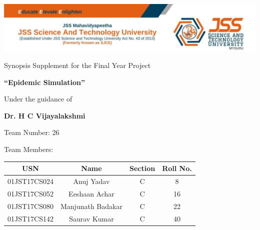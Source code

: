 \documentclass[14pt, a4paper]{extarticle}
\begin{document}
    \begin{titlepage}
		\thispagestyle{empty}
		\thisfancypage{\setlength{\fboxsep}{1pt}\doublebox}{}
		
		\begin{center}
    		\includegraphics[scale=0.26]{images/jss_header.png}
    		
    		\vspace{0.5in}
			Synopsis Supplement for the Final Year Project
		
			\vspace{0.125in}
			{\Large \textbf{``Epidemic Simulation''}}
			
			\vspace{0.5in}
			Under the guidance of
			
			\vspace{0.125in}
			\textbf{Dr. H C Vijayalakshmi}
		\end{center}
			
		\vspace{0.5in}
		\hspace{0.25in}Team Number: 26
				
		\hspace{0.25in}Team Members:
		
		\vspace{0.125in}
        \begin{table}[h!]
            \begin{center}
                \begin{tabular}{|c|c|c|c|} \hline
                	\textbf{USN} & \textbf{Name} & \textbf{Section} & \textbf{Roll No.} \\ \hline
	                01JST17CS024 & Anuj Yadav & C & 8\\ \hline
    	            01JST17CS052 & Eeshaan Achar & C & 16\\ \hline
        	        01JST17CS080 & Manjunath Badakar & C & 22\\ \hline
            	    01JST17CS142 & Saurav Kumar & C & 40\\ \hline
                \end{tabular}
            \end{center}
		\end{table}
            

\end{titlepage}
\end{document}
